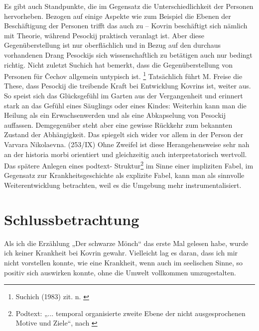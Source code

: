 \documentclass{../../sem_paper}
\begin{document}
Es gibt auch Standpunkte, die im Gegensatz die Unterschiedlichkeit der 
Personen hervorheben.\autocite{winner}
Bezogen auf einige Aspekte wie zum Beispiel die Ebenen der Beschäftigung der Personen trifft das
auch zu -- Kovrin beschäftigt sich nämlich mit Theorie, während Pesockij praktisch veranlagt ist.
Aber diese Gegenüberstellung ist nur oberflächlich und in Bezug auf den durchaus vorhandenen
Drang Pesockijs sich wissenschaftlich zu betätigen auch nur bedingt richtig. Nicht zuletzt Suchich
hat bemerkt, dass die Gegenüberstellung von Personen für Čechov allgemein untypisch ist.
\footnote{Suchich (1983) zit. n. \autocite{freise91}} 
Tatsächlich führt M. Freise die These, dass Pesockij die treibende Kraft bei Entwicklung Kovrins
ist, weiter aus. So speist sich das Glücksgefühl im Garten aus der Vergangenheit und erinnert stark
an das Gefühl eines Säuglings oder eines Kindes: 
Weiterhin kann man die Heilung als ein Erwachsenwerden und als eine Abkapselung von Pesockij
auffassen. Demgegenüber steht aber eine gewisse Rückkehr zum bekannten Zustand der
Abhängigkeit. Das spiegelt sich wider vor allem in der Person der Varvara Nikolaevna. (253/IX) Ohne Zweifel ist diese Herangehensweise sehr nah an der historia
morbi orientiert und gleichzeitig auch interpretatorisch wertvoll. Das spätere Anlegen eines podtext-
Struktur\footnote{
Podtext: „... temporal organisierte zweite Ebene der nicht ausgesprochenen Motive und Ziele“, nach \autocite{freise97}
} im Sinne einer impliziten Fabel, im Gegensatz zur Krankheitsgeschichte als explizite
Fabel, kann man als sinnvolle Weiterentwicklung betrachten, weil es die Umgebung mehr
instrumentalisiert.

\section*{Schlussbetrachtung}
Als ich die Erzählung „Der schwarze Mönch“ das erste Mal gelesen habe, wurde ich keiner
Krankheit bei Kovrin gewahr. Vielleicht lag es daran, dass ich mir nicht vorstellen konnte, wie eine
Krankheit, wenn auch im seelischen Sinne, so positiv sich auswirken konnte, ohne die Umwelt
vollkommen umzugestalten.
\end{document}
